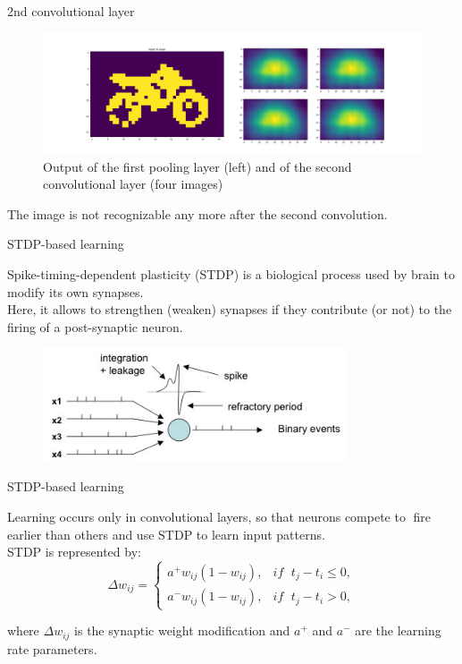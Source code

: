 \documentclass[10pt]{beamer}
\begin{document}
\begin{frame}{2nd convolutional layer}

\begin{figure}[h]
	\centering
	\includegraphics[width=\textwidth]{images/Figure_10}
	\caption{Output of the first pooling layer (left) and of the second convolutional layer (four images)}
\end{figure}

The image is not recognizable any more after the second convolution.

\end{frame}

\begin{frame}{STDP-based learning}

Spike-timing-dependent plasticity (STDP) is a biological process used by brain to modify its own synapses.\\
\bigskip
Here, it allows to strengthen (weaken) synapses if they contribute (or not) to the firing of a post-synaptic neuron.
\begin{figure}[h]
	\centering
	\includegraphics[width=0.8\textwidth]{images/spikes}
\end{figure}

\end{frame}

\begin{frame}{STDP-based learning}

Learning occurs only in convolutional layers, so that neurons compete to fire earlier than others and use STDP to learn input patterns.\\
\bigskip
STDP is represented by:
\begin{equation*}
\Delta w_{ij} = \begin{cases}
a^{+}w_{ij}(1-w_{ij}), & \textit{if }\; t_{j}-t_{i} \leq 0,\\
a^{-}w_{ij}(1-w_{ij}), & \textit{if }\; t_{j}-t_{i} > 0,
\end{cases}
\end{equation*}

where $ \Delta w_{ij} $ is the synaptic weight modification and $ a^{+} $ and $ a^{-} $ are the learning rate parameters. 

\end{frame}
\end{document}
